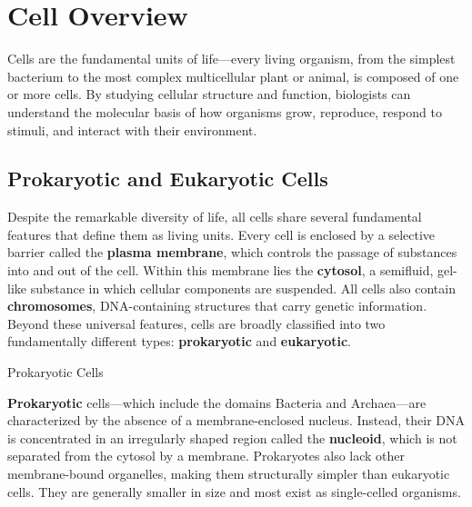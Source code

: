 \documentclass[10pt]{article}
\begin{document}
\section{Cell Overview}

  Cells are the fundamental units of life---every living organism, from the simplest bacterium to the most complex multicellular plant or animal, is composed of one or more cells. By studying cellular structure and function, biologists can understand the molecular basis of how organisms grow, reproduce, respond to stimuli, and interact with their environment.
    
  \subsection{Prokaryotic and Eukaryotic Cells}

    Despite the remarkable diversity of life, all cells share several fundamental features that define them as living units. Every cell is enclosed by a selective barrier called the \textbf{plasma membrane}, which controls the passage of substances into and out of the cell. Within this membrane lies the \textbf{cytosol}, a semifluid, gel-like substance in which cellular components are suspended. All cells also contain \textbf{chromosomes}, DNA-containing structures that carry genetic information. Beyond these universal features, cells are broadly classified into two fundamentally different types: \textbf{prokaryotic} and \textbf{eukaryotic}.

    \begin{core}{Prokaryotic Cells}

      \textbf{Prokaryotic} cells---which include the domains Bacteria and Archaea---are characterized by the absence of a membrane-enclosed nucleus. Instead, their DNA is concentrated in an irregularly shaped region called the \textbf{nucleoid}, which is not separated from the cytosol by a membrane. Prokaryotes also lack other membrane-bound organelles, making them structurally simpler than eukaryotic cells. They are generally smaller in size and most exist as single-celled organisms.


    \end{core}
\end{document}
